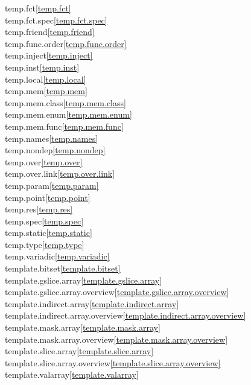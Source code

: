 \begin{multicols}{2}
temp.fct\quad\ref{temp.fct}\\
temp.fct.spec\quad\ref{temp.fct.spec}\\
temp.friend\quad\ref{temp.friend}\\
temp.func.order\quad\ref{temp.func.order}\\
temp.inject\quad\ref{temp.inject}\\
temp.inst\quad\ref{temp.inst}\\
temp.local\quad\ref{temp.local}\\
temp.mem\quad\ref{temp.mem}\\
temp.mem.class\quad\ref{temp.mem.class}\\
temp.mem.enum\quad\ref{temp.mem.enum}\\
temp.mem.func\quad\ref{temp.mem.func}\\
temp.names\quad\ref{temp.names}\\
temp.nondep\quad\ref{temp.nondep}\\
temp.over\quad\ref{temp.over}\\
temp.over.link\quad\ref{temp.over.link}\\
temp.param\quad\ref{temp.param}\\
temp.point\quad\ref{temp.point}\\
temp.res\quad\ref{temp.res}\\
temp.spec\quad\ref{temp.spec}\\
temp.static\quad\ref{temp.static}\\
temp.type\quad\ref{temp.type}\\
temp.variadic\quad\ref{temp.variadic}\\
template.bitset\quad\ref{template.bitset}\\
template.gslice.array\quad\ref{template.gslice.array}\\
template.gslice.array.overview\quad\ref{template.gslice.array.overview}\\
template.indirect.array\quad\ref{template.indirect.array}\\
template.indirect.array.overview\quad\ref{template.indirect.array.overview}\\
template.mask.array\quad\ref{template.mask.array}\\
template.mask.array.overview\quad\ref{template.mask.array.overview}\\
template.slice.array\quad\ref{template.slice.array}\\
template.slice.array.overview\quad\ref{template.slice.array.overview}\\
template.valarray\quad\ref{template.valarray}\\

\end{multicols}
